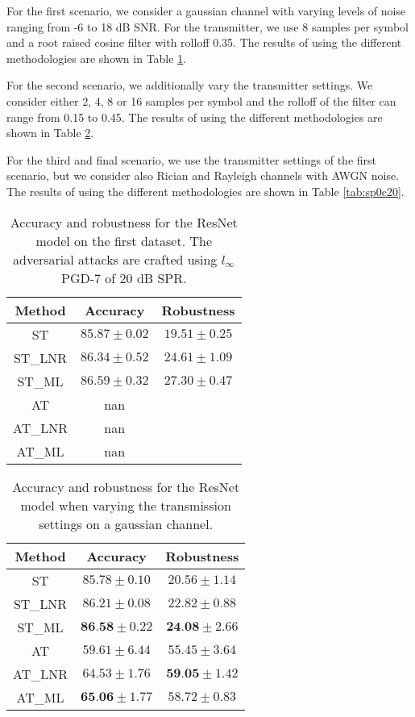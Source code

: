 \documentclass[conference]{IEEEtran}
\begin{document}
For the first scenario, we consider a gaussian channel with varying levels of noise ranging from -6 to 18 dB SNR. For the transmitter, we use 8 samples per symbol and a root raised cosine filter with rolloff 0.35. The results of using the different methodologies are shown in Table \ref{tab:sbasic}.

For the second scenario, we additionally vary the transmitter settings. We consider either 2, 4, 8 or 16 samples per symbol and the rolloff of the filter can range from 0.15 to 0.45. The results of using the different methodologies are shown in Table \ref{tab:sawgn2p}.

For the third and final scenario, we use the transmitter settings of the first scenario, but we consider also Rician and Rayleigh channels with AWGN noise. The results of using the different methodologies are shown in Table \ref{tab:sp0c20}. %

\begin{table}[htbp]
	\centering
	\begin{tabular}{c|cc}
	    Method & Accuracy & Robustness \\
		\hline
		ST & $85.87 \pm 0.02$ & $19.51 \pm 0.25$ \\ 
		ST\_LNR & $86.34 \pm 0.52$ & $24.61 \pm 1.09$ \\ 
		ST\_ML & $86.59 \pm 0.32$ & $27.30 \pm 0.47$ \\ 
		AT & nan \\ 
		AT\_LNR & nan \\ 
		AT\_ML & nan \\ 
    \end{tabular}
    \caption{Accuracy and robustness for the ResNet model on the first dataset. The adversarial attacks are crafted using $l_{\infty}$ PGD-7 of 20 dB SPR.}
    \label{tab:sbasic}
\end{table}

\begin{table}[htbp]
	\centering
	\begin{tabular}{c|cc}
	    Method & Accuracy & Robustness \\
		\hline
		ST & $85.78 \pm 0.10$ & $20.56 \pm 1.14$ \\ 
		ST\_LNR & $86.21 \pm 0.08$ & $22.82 \pm 0.88$ \\ 
		ST\_ML & $\textbf{86.58} \pm 0.22$ & $\textbf{24.08} \pm 2.66$ \\
        \hline
		AT & $59.61 \pm 6.44$ & $55.45 \pm 3.64$ \\ 
		AT\_LNR & $64.53 \pm 1.76$ & $\textbf{59.05} \pm 1.42$ \\ 
		AT\_ML & $\textbf{65.06} \pm 1.77$ & $58.72 \pm 0.83$ \\ 
    \end{tabular}
    \caption{Accuracy and robustness for the ResNet model when varying the transmission settings on a gaussian channel.}
    \label{tab:sawgn2p}
\end{table}
\end{document}

